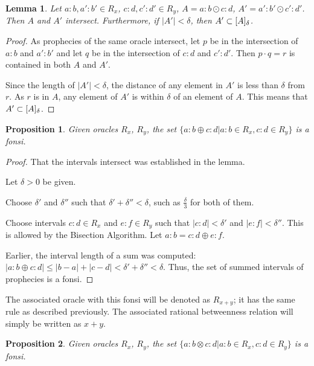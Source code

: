 \documentclass[12pt]{article}
\newtheorem{lemma}{Lemma}[section]
\newtheorem{proposition}{Proposition}[section]
\begin{document}
\begin{lemma}
    Let $a:b, a':b' \in R_{x}$, $c:d, c':d' \in R_y$, $A =  a:b \odot c:d$, $A' =  a':b' \odot c':d'$. Then $A$ and $A'$ intersect. Furthermore, if $|A'| < \delta$, then $A' \subset [A]_{\delta}$.
\end{lemma}

\begin{proof}   
    As prophecies of the same oracle intersect, let $p$ be in the intersection of $a:b$ and $a':b'$ and let $q$ be in the intersection of $c:d$ and $c':d'$. Then $p \cdot q = r$ is contained in both $A$ and $A'$. 
    
    Since the length of $|A'| < \delta$, the distance of any element in $A'$ is less than $\delta$ from $r$. As $r$ is in $A$, any element of $A'$ is within $\delta$ of an element of $A$. This means that $A' \subset [A]_{\delta}$.
\end{proof}


\begin{proposition}
    Given oracles $R_x$, $R_y$, the set $\{a:b \oplus c:d| a:b \in R_x, c:d \in R_y\}$ is a fonsi. 
\end{proposition}

\begin{proof}
    That the intervals intersect was established in the lemma. 

    Let $\delta > 0$ be given. 

    Choose $\delta'$ and $\delta''$ such that $\delta' + \delta'' < \delta$, such as $\frac{\delta}{3}$ for both of them. 

    Choose intervals $c:d \in R_x$ and $e:f \in R_y$  such that  $|c:d| < \delta'$ and $|e:f| < \delta''$. This is allowed by the Bisection Algorithm. Let $a:b = c:d \oplus e:f$.
     
    Earlier, the interval length of a sum was computed:  $|a:b \oplus c:d| \leq |b-a| + |c-d| < \delta' + \delta'' < \delta$. Thus, the set of summed intervals of prophecies is a fonsi. 
    
\end{proof}


The associated oracle with this fonsi will be denoted as $R_{x + y}$; it has the same rule as described previously. The associated rational betweenness relation will simply be written as $x+y$. 

\begin{proposition}
    Given oracles $R_x$, $R_y$, the set $\{a:b \otimes c:d| a:b \in R_x, c:d \in R_y\}$ is a fonsi. 
\end{proposition}
\end{document}
